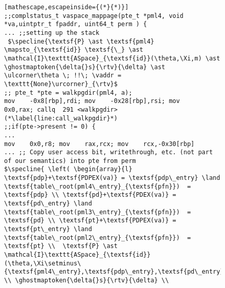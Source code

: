 \begin{figure}\footnotesize
  \begin{lstlisting}[mathescape,escapeinside={(*}{*)}]
;;complstatus_t vaspace_mappage(pte_t *pml4, void *va,uintptr_t fpaddr, uint64_t perm ) {
... ;;setting up the stack      
 $\specline{\textsf{P} \ast \textsf{pml4} \mapsto_{\textsf{id}} \textsf{\_} \ast \mathcal{I}\texttt{ASpace}_{\textsf{id}}(\theta,\Xi,m) \ast \ghostmaptoken{\delta{}s}{\rtv}{\delta} \ast \ulcorner\theta \; !!\; \vaddr = \texttt{None}\urcorner}_{\rtv}$      
;; pte_t *pte = walkpgdir(pml4, a);
mov    -0x8[rbp],rdi; mov    -0x28[rbp],rsi; mov    0x0,rax; callq  291 <walkpgdir> (*\label{line:call_walkpgdir}*)
;;if(pte->present != 0) {
...        
mov    0x0,r8; mov    rax,rcx; mov    rcx,-0x30[rbp]
... ;; Copy user access bit, writethrough, etc. (not part of our semantics) into pte from perm
$\specline{ \left( \begin{array}{l} \textsf{pdp}+\textsf{PDPEX(va)} = \textsf{pdp\_entry} \land \textsf{table\_root(pml4\_entry}_{\textsf{pfn}})  = \textsf{pdp} \\ \textsf{pd}+\textsf{PDEX(va)} = \textsf{pd\_entry} \land \textsf{table\_root(pml3\_entry}_{\textsf{pfn}})  = \textsf{pd} \\ \textsf{pt}+\textsf{PDPEX(va)} = \textsf{pt\_entry} \land \textsf{table\_root(pml2\_entry}_{\textsf{pfn}})  = \textsf{pt} \\  \textsf{P} \ast \mathcal{I}\texttt{ASpace}_{\textsf{id}}(\theta,\Xi\setminus\{\textsf{pml4\_entry},\textsf{pdp\_entry},\textsf{pd\_entry},\textsf{pt\_entry}\},m)  \\ \ghostmaptoken{\delta{}s}{\rtv}{\delta} \\

\end{lstlisting}
\end{figure}
